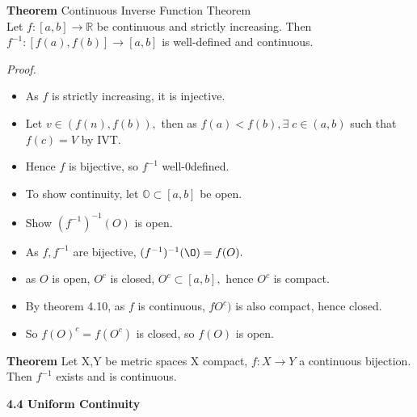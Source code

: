 \documentclass[12pt]{article}
\begin{document}
\begin{block}{\bf Theorem} Continuous Inverse Function Theorem\\
Let $f:[a,b]\rightarrow\mathbb{R}$ be continuous and strictly increasing. Then $f^{-1}:[f(a),f(b)]\rightarrow [a,b]$ is well-defined and continuous.\end{block}

\vspace{1.5\baselinestretch}
{\sl Proof.}
\begin{itemize}
    \item As $f$ is strictly increasing, it is injective.
    \item Let $v\in (f(n), f(b)),$ then as $f(a)<f(b), \exists\;c\in(a,b)$ such that $f(c)=V$ by IVT.
    \item Hence $f$ is bijective, so $f^{-1}$ well-0defined.
    \item To show continuity, let $\mathbb{O}\subset[a,b]$ be open.
    \item Show $(f^{-1})^{-1}(O)$ is open.
    \item As $f, f^{-1}$ are bijective, $(f^{-1})^{-1}(\O) = f(O).$
    \item as $O$ is open, $O^c$ is closed, $O^c \subset[a,b],$ hence $O^c$ is compact.
    \item By theorem 4.10, as $f$ is continuous, $fO^c)$ is also compact, hence closed.
    \item So $f(O)^c = f(O^c)$ is closed, so $f(O)$ is open.
\end{itemize}

\vspace{1.5\baselineskip}
\begin{block}{\bf Theorem}
Let X,Y be metric spaces X compact, $f: X\rightarrow Y$ a continuous bijection. Then $f^{-1}$ exists and is continuous.
\end{block}

\vspace{1.5\baselineskip}
{\bf 4.4 Uniform Continuity}\\
\end{document}
